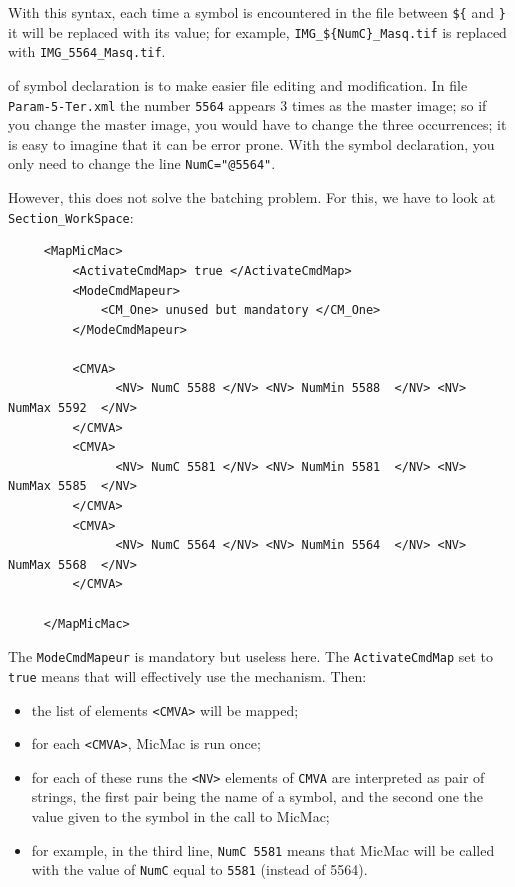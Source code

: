 With this syntax, each time a symbol is encountered in the file between {\tt \$\{} and  {\tt \}}
it  will be replaced with its value; for example, {\tt IMG\_\$\{NumC\}\_Masq.tif} is replaced
with {\tt IMG\_5564\_Masq.tif}.

 of symbol declaration is to make easier file
editing and modification. In file {\tt Param-5-Ter.xml} the number {\tt 5564} appears
$3$ times as the master image; so if you change the master image, you would have to change
the three occurrences; it is easy to imagine that it can be error prone. With the symbol
declaration, you only need to change the line {\tt  NumC="@5564"}.

However, this does not solve the batching problem.
For this, we have to look at {\tt Section\_WorkSpace}:

{\scriptsize
\begin{verbatim}
     <MapMicMac>
         <ActivateCmdMap> true </ActivateCmdMap>
         <ModeCmdMapeur>
             <CM_One> unused but mandatory </CM_One>
         </ModeCmdMapeur>

         <CMVA>
               <NV> NumC 5588 </NV> <NV> NumMin 5588  </NV> <NV> NumMax 5592  </NV>
         </CMVA>
         <CMVA>
               <NV> NumC 5581 </NV> <NV> NumMin 5581  </NV> <NV> NumMax 5585  </NV>
         </CMVA>
         <CMVA>
               <NV> NumC 5564 </NV> <NV> NumMin 5564  </NV> <NV> NumMax 5568  </NV>
         </CMVA>

     </MapMicMac>
\end{verbatim}
}

The {\tt ModeCmdMapeur} is mandatory but useless here. The {\tt ActivateCmdMap} set to {\tt true}
means that will effectively use the mechanism. Then:

\begin{itemize}
    \item the list of elements {\tt <CMVA>} will be mapped;
    \item for each {\tt <CMVA>}, MicMac is run once;
    \item for each of these runs the {\tt <NV>}  elements of  {\tt CMVA} are
          interpreted as pair of strings, the first pair being the name of a symbol, and
          the second one the value given to the symbol in the call to MicMac;
    \item for example, in the third line, {\tt NumC 5581} means that MicMac will
          be called with the value of {\tt NumC} equal to {\tt 5581} (instead of 5564).
\end{itemize}

